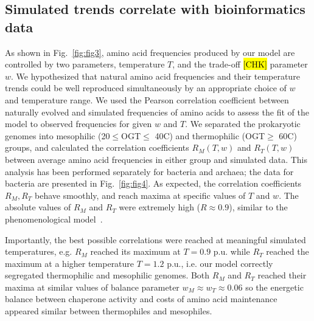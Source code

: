 \documentclass[10pt,letterpaper]{article}
\begin{document}

\subsection*{Simulated trends correlate with bioinformatics data}

As shown in Fig.~\ref{fig:fig3}, amino acid frequencies produced by our model are controlled by two parameters, temperature $T$, and the trade-off \hl{[CHK]} parameter $w$. We hypothesized that natural amino acid frequencies and their temperature trends could be well reproduced simultaneously by an appropriate choice of $w$ and temperature range. We used the Pearson correlation coefficient between naturally evolved and simulated frequencies of amino acids to assess the fit of the model to observed frequencies for given $w$ and $T$. We separated the prokaryotic genomes into mesophilic (20$\leq$OGT$\leq$ 40\textdegree C) and thermophilic (OGT$\geq$ 60\textdegree C) groups, and calculated the correlation coefficients $R_M(T,w)$ and $R_T(T,w)$ between average amino acid frequencies in either group and simulated data. This analysis has been performed separately for bacteria and archaea; the data for bacteria are presented in Fig.~\ref{fig:fig4}. As expected, the correlation coefficients $R_M, R_T$ behave smoothly, and reach maxima at specific values of $T$ and $w$. The absolute values of $R_M$ and $R_T$ were extremely high ($R\approx0.9$), similar to the phenomenological model~\cite{Krick2014Amino}. 

Importantly, the best possible correlations were reached at meaningful simulated temperatures, e.g. $R_M$ reached its maximum at $T=0.9$ p.u. while $R_T$ reached the maximum at a higher temperature $T=1.2$ p.u., i.e. our model correctly segregated thermophilic and mesophilic genomes. Both $R_M$ and $R_T$ reached their maxima at similar values of balance parameter $w_M\approx w_T \approx 0.06$ so the energetic balance between chaperone activity and costs of amino acid maintenance appeared similar between thermophiles and mesophiles.
\end{document}
